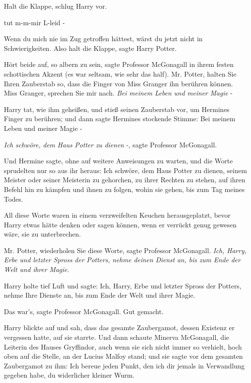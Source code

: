\glqq{}Halt die Klappe\grqq{}, schlug Harry vor.

\glqq{}tut m-m-mir L-leid -\grqq{}

\glqq{}Wenn du mich nie im Zug getroffen hättest, wärst du jetzt nicht in
Schwierigkeiten. Also halt die Klappe\grqq{}, sagte Harry Potter.

\glqq{}Hört beide auf, so albern zu sein\grqq{}, sagte Professor McGonagall in
ihrem festen schottischen Akzent (es war seltsam, wie sehr das half). \glqq{}Mr.
Potter, halten Sie Ihren Zauberstab so, dass die Finger von Miss Granger ihn
berühren können. Miss Granger, sprechen Sie mir nach. \emph{Bei meinem Leben und
meiner Magie} -\grqq{}

Harry tat, wie ihm geheißen, und stieß seinen Zauberstab vor, um Hermines Finger
zu berühren; und dann sagte Hermines stockende Stimme: \glqq{}Bei meinem Leben
und meiner Magie -\grqq{}

\glqq{}\emph{Ich schwöre, dem Haus Potter zu dienen} -\grqq{}, sagte Professor
McGonagall.

Und Hermine sagte, ohne auf weitere Anweisungen zu warten, und die Worte
sprudelten nur so aus ihr heraus: \glqq{}Ich schwöre, dem Haus Potter zu dienen,
seinem Meister oder seiner Meisterin zu gehorchen, zu ihrer Rechten zu stehen,
auf ihren Befehl hin zu kämpfen und ihnen zu folgen, wohin sie gehen, bis zum
Tag meines Todes.\grqq{}

All diese Worte waren in einem verzweifelten Keuchen herausgeplatzt, bevor Harry
etwas hätte denken oder sagen können, wenn er verrückt genug gewesen wäre, sie
zu unterbrechen.

\glqq{}Mr. Potter, wiederholen Sie diese Worte\grqq{}, sagte Professor
McGonagall. \glqq{}\emph{Ich, Harry, Erbe und letzter Spross der Potters, nehme
deinen Dienst an, bis zum Ende der Welt und ihrer Magie.}\grqq{}

Harry holte tief Luft und sagte: \glqq{}Ich, Harry, Erbe und letzter Spross der
Potters, nehme Ihre Dienste an, bis zum Ende der Welt und ihrer Magie.\grqq{}

\glqq{}Das war's\grqq{}, sagte Professor McGonagall. \glqq{}Gut gemacht.\grqq{}

Harry blickte auf und sah, dass das gesamte Zaubergamot, dessen Existenz er
vergessen hatte, auf sie starrte. Und dann schaute Minerva McGonagall, die
Leiterin des Hauses Gryffindor, auch wenn sie sich nicht immer so verhielt, hoch
oben auf die Stelle, an der Lucius Malfoy stand; und sie sagte vor dem gesamten
Zaubergamot zu ihm: \glqq{}Ich bereue jeden Punkt, den ich dir jemals in
Verwandlung gegeben habe, du widerlicher kleiner Wurm.\grqq{}

